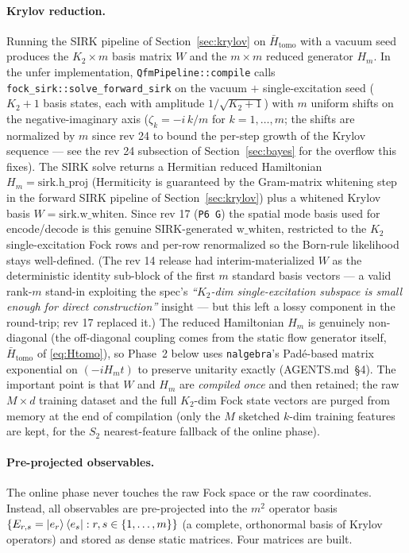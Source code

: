 \documentclass[11pt, a4paper]{article}
\begin{document}
\paragraph{Krylov reduction.} Running the SIRK pipeline of
Section~\ref{sec:krylov} on $\bar H_{\mathrm{tomo}}$ with a vacuum seed
produces the $K_2\times m$ basis matrix $W$ and the $m\times m$ reduced
generator $H_m$. In the unfer implementation, \texttt{QfmPipeline::compile}
calls \texttt{fock\_sirk::solve\_forward\_sirk} on the vacuum $+$
single-excitation seed ($K_2+1$ basis states, each with amplitude
$1/\sqrt{K_2+1}$) with $m$ uniform shifts on the negative-imaginary axis
($\zeta_k=-i\,k/m$ for $k=1,\dots,m$; the shifts are normalized by $m$
since rev 24 to bound the per-step growth of the Krylov sequence --- see
the rev 24 subsection of Section~\ref{sec:bayes} for the overflow this
fixes). The SIRK solve returns a Hermitian reduced Hamiltonian
$H_m=\mathrm{sirk.h\_proj}$ (Hermiticity is guaranteed by the Gram-matrix
whitening step in the forward SIRK pipeline of Section~\ref{sec:krylov}) plus a
whitened Krylov basis $W=\mathrm{sirk.w\_whiten}$. Since rev 17
(\texttt{P6 G}) the spatial mode basis used for encode/decode is this
genuine SIRK-generated $\mathrm{w\_whiten}$, restricted to the $K_2$
single-excitation Fock rows and per-row renormalized so the Born-rule
likelihood stays well-defined. (The rev 14 release had interim-materialized
$W$ as the deterministic identity sub-block of the first $m$ standard basis
vectors --- a valid rank-$m$ stand-in exploiting the spec's \emph{``$K_2$-dim
single-excitation subspace is small enough for direct construction''}
insight --- but this left a lossy component in the round-trip; rev 17
replaced it.) The reduced Hamiltonian
$H_m$ is genuinely non-diagonal (the off-diagonal coupling comes
from the static flow generator itself, $\bar H_{\mathrm{tomo}}$ of
\eqref{eq:Htomo}), so Phase~2 below uses \texttt{nalgebra}'s
Pad\'e-based matrix exponential on $(-i H_m t)$ to preserve unitarity
exactly (AGENTS.md~\S4). The important point is that $W$ and $H_m$ are
\emph{compiled once} and then retained; the raw $M\times d$ training
dataset and the full $K_2$-dim Fock state vectors are purged from memory
at the end of compilation (only the $M$ sketched $k$-dim training features
are kept, for the $S_2$ nearest-feature fallback of the online phase).

\paragraph{Pre-projected observables.} The online phase never touches the
raw Fock space or the raw coordinates. Instead, all observables are
pre-projected into the $m^2$ operator basis
$\{E_{r,s}=\ket{e_r}\bra{e_s}:r,s\in\{1,\dots,m\}\}$ (a complete,
orthonormal basis of Krylov operators) and stored as dense static matrices.
Four matrices are built.
\end{document}
